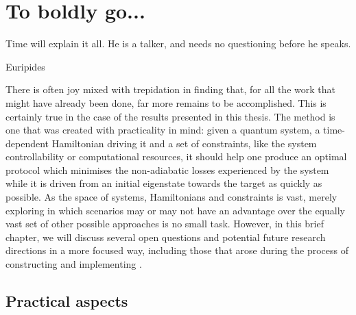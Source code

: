\chapter{To boldly go...}\label{chap:9_Future_directions}

\epigraph{Time will explain it all. He is a talker, and needs no questioning before he speaks.}{Euripides}

There is often joy mixed with trepidation in finding that, for all the work that might have already been done, far more remains to be accomplished. This is certainly true in the case of the results presented in this thesis. The  method is one that was created with practicality in mind: given a quantum system, a time-dependent Hamiltonian driving it and a set of constraints, like the system controllability or computational resources, it should help one produce an optimal protocol which minimises the non-adiabatic losses experienced by the system while it is driven from an initial eigenstate towards the target as quickly as possible. As the space of systems, Hamiltonians and constraints is vast, merely exploring in which scenarios  may or may not have an advantage over the equally vast set of other possible approaches is no small task. However, in this brief chapter, we will discuss several open questions and potential future research directions in a more focused way, including those that arose during the process of constructing and implementing . 

\section{Practical aspects}

